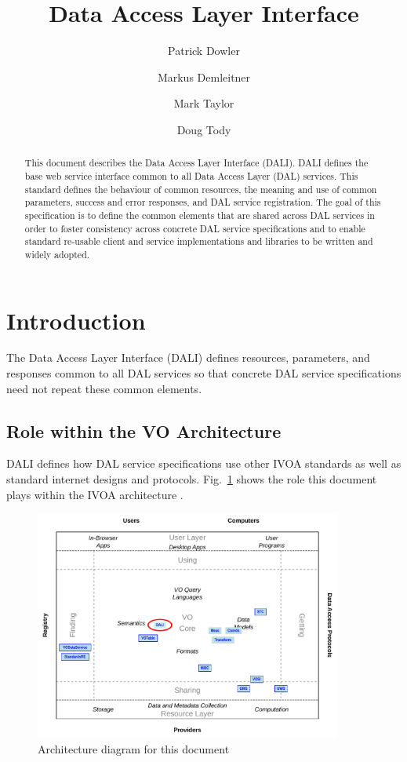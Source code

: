\documentclass[11pt,letter]{ivoa}
\title{Data Access Layer Interface}
\author{Patrick Dowler}
\author{Markus Demleitner}
\author{Mark Taylor}
\author{Doug Tody}
\begin{document}
\begin{abstract}
This document describes the Data Access Layer Interface (DALI). DALI defines 
the base web service interface common to all Data Access Layer (DAL) services. 
This standard defines the behaviour of common resources, the meaning and use of 
common parameters, success and error responses, and DAL service registration. 
The goal of this specification is to define the common elements that are shared 
across DAL services in order to foster consistency across concrete DAL service 
specifications and to enable standard re-usable client and service 
implementations and libraries to be written and widely adopted.
\end{abstract}

\section{Introduction}
The Data Access Layer Interface (DALI) defines resources, parameters, and 
responses common to all DAL services so that concrete DAL service specifications 
need not repeat these common elements.

\subsection{Role within the VO Architecture}
DALI defines how DAL service specifications use other IVOA standards as well as 
standard internet designs and protocols. Fig.~\ref{fig:archdiag} shows the role 
this document plays within the IVOA architecture \citep{2021ivoa.spec.1101D}.

\begin{figure}
\centering


\includegraphics[width=0.9\textwidth]{role_diagram.pdf}
\caption{Architecture diagram for this document}
\label{fig:archdiag}
\end{figure}
\end{document}
